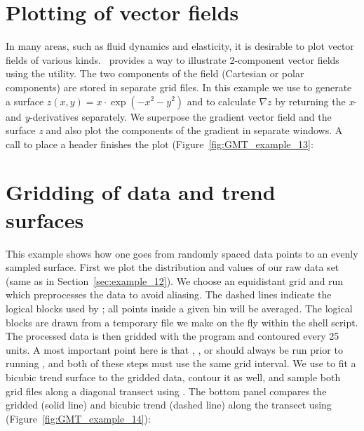 

\section{Plotting of vector fields}

In many areas, such as fluid dynamics and elasticity,
it is desirable to plot vector fields of various kinds.
\GMT\ provides a way to illustrate 2-component vector fields
using the  utility.  The two components of
the field (Cartesian or polar components) are stored in
separate grid files.  In this example we use 
to generate a surface $z(x, y) = x \cdot \exp(-x^2 -y^2)$
and to calculate $\nabla z$ by
returning the \emph{x}- and \emph{y}-derivatives separately.
We superpose the gradient vector field and the surface
\emph{z} and also plot the components of the gradient
in separate windows.
A  call to place a header finishes the plot
(Figure~\ref{fig:GMT_example_13}:



\section{Gridding of data and trend surfaces}

This example shows how one goes from randomly spaced data
points to an evenly sampled surface.  First we plot the
distribution and values of our raw data set (same as in
Section~\ref{sec:example_12}).  We choose an equidistant grid and run
 which preprocesses the data to avoid aliasing.
The dashed lines indicate the logical blocks used by
; all points inside a given bin will be averaged.
The logical blocks are drawn from a temporary file we make on
the fly within the shell script.  The processed data is then
gridded with the  program and contoured every 25
units.  A most important point here is that ,
, or  should always be run
prior to running , and both of these steps must use the same
grid interval.  We use  to fit a bicubic trend
surface to the gridded data, contour it as well, and sample
both grid files along a diagonal transect using .
The bottom panel compares the gridded (solid line) and bicubic
trend (dashed line) along the transect using 
(Figure~\ref{fig:GMT_example_14}):


